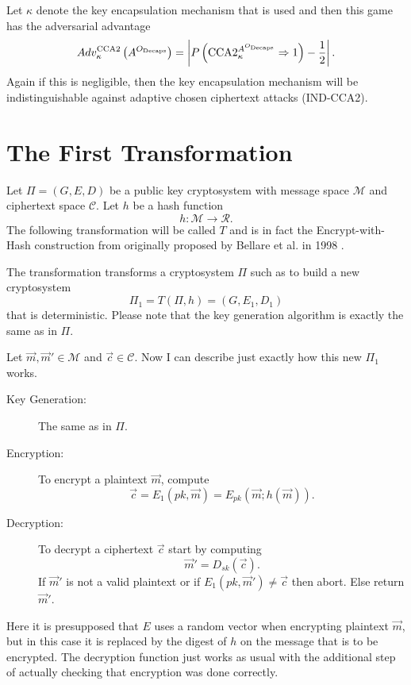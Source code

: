 Let $\kappa$ denote the key encapsulation mechanism that is used and then this game has the adversarial advantage
\[
	Adv^{\mathrm{CCA}2}_{\kappa}\left( A^{O_{\mathrm{Decaps}}} \right) = \left\vert P\left( \mathrm{CCA}2^{A^{O_{\mathrm{Decaps}}}}_{\kappa} \Rightarrow 1 \right) - \frac{1}{2} \right\vert .
\]
Again if this is negligible, then the key encapsulation mechanism will be indistinguishable against adaptive chosen ciphertext attacks (IND-CCA2).



\section{The First Transformation}
\label{sec:theFirMod}

Let $\Pi = \left(G,E,D\right)$ be a public key cryptosystem with message space $\mathcal{M}$ and ciphertext space $\mathcal{C}$. Let $h$ be a hash function
\[
	h: \mathcal{M} \rightarrow \mathcal{R}.
\]
The following transformation will be called $T$ and is in fact the Encrypt-with-Hash construction from \cite{BBO} originally proposed by Bellare et al. in 1998 \cite{BHSV}.

The transformation transforms a cryptosystem $\Pi$ such as to build a new cryptosystem
\[
	\Pi_1 = T\left(\Pi, h\right) = \left(G, E_1, D_1\right)
\]
that is deterministic. Please note that the key generation algorithm is exactly the same as in $\Pi$.

Let $\vec{m},\vec{m}' \in \mathcal{M}$ and $\vec{c} \in \mathcal{C}$. Now I can describe just exactly how this new $\Pi_1$ works.
\begin{description}
	\item[Key Generation:] The same as in $\Pi$.
	\item[Encryption:] To encrypt a plaintext $\vec{m}$, compute
		\[
			\vec{c} = E_1\left(pk, \vec{m}\right) = E_{pk}\left(\vec{m}; h\left(\vec{m}\right)\right).
		\]
	\item[Decryption:] To decrypt a ciphertext $\vec{c}$ start by computing
		\[
			\vec{m}' = D_{sk}\left(\vec{c}\right).
		\]
		If $\vec{m}'$ is not a valid plaintext or if $E_1\left(pk, \vec{m}'\right) \neq \vec{c}$ then abort. Else return $\vec{m}'$.
\end{description}
Here it is presupposed that $E$ uses a random vector when encrypting plaintext $\vec{m}$, but in this case it is replaced by the digest of $h$ on the message that is to be encrypted. The decryption function just works as usual with the additional step of actually checking that encryption was done correctly.



